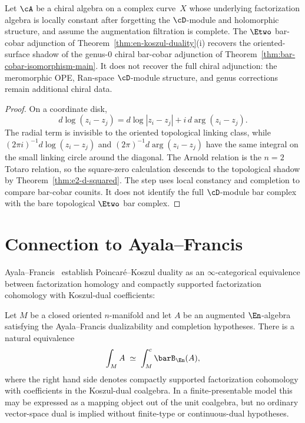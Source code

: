\begin{corollary}[Topological \texorpdfstring{$n = 2$}{n = 2} shadow of chiral bar-cobar;
\ClaimStatusConditional]
\label{cor:n2-recovery}
Let $\cA$ be a chiral algebra on a complex curve~$X$ whose
underlying factorization algebra is locally constant after forgetting
the $\cD$-module and holomorphic structure, and assume the
augmentation filtration is complete. The $\Etwo$ bar-cobar
adjunction of Theorem~\textup{\ref{thm:en-koszul-duality}(i)}
recovers the oriented-surface shadow of the genus-$0$ chiral
bar-cobar adjunction of
Theorem~\textup{\ref{thm:bar-cobar-isomorphism-main}}. It does not
recover the full chiral adjunction: the meromorphic OPE, Ran-space
$\cD$-module structure, and genus corrections remain additional
chiral data.
\end{corollary}

\begin{proof}
On a coordinate disk,
\[
d\log(z_i-z_j)=d\log|z_i-z_j|+i\,d\arg(z_i-z_j).
\]
The radial term is invisible to the oriented topological linking
class, while $(2\pi i)^{-1}d\log(z_i-z_j)$ and
$(2\pi)^{-1}d\arg(z_i-z_j)$ have the same integral on the small
linking circle around the diagonal. The Arnold relation is the
$n=2$ Totaro relation, so the square-zero calculation descends to
the topological shadow by Theorem~\ref{thm:e2-d-squared}. The step
uses local constancy and completion to compare bar-cobar counits.
It does not identify the full $\cD$-module bar complex with the bare
topological $\Etwo$ bar complex.
\end{proof}



\section{Connection to Ayala--Francis}
\label{sec:ayala-francis-connection}

Ayala--Francis~\cite{AF15} establish Poincar\'e--Koszul duality as
an $\infty$-categorical equivalence between factorization homology
and compactly supported factorization cohomology with Koszul-dual
coefficients:

\begin{theorem}
\label{thm:af-pkd}
Let $M$ be a closed oriented $n$-manifold and let $A$ be an
augmented $\En$-algebra satisfying the Ayala--Francis
dualizability and completion hypotheses.
There is a natural equivalence
\[
\int_M A
\;\simeq\;
\int_M^c \barB_{\En}(A),
\]
where the right hand side denotes compactly supported
factorization cohomology with coefficients in the Koszul-dual
coalgebra. In a finite-presentable model this may be expressed as a
mapping object out of the unit coalgebra, but no ordinary vector-space
dual is implied without finite-type or continuous-dual hypotheses.
\end{theorem}

